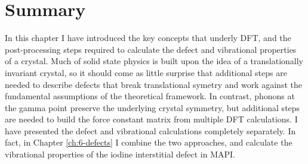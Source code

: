 
\section{Summary}

In this chapter I have introduced the key concepts that underly DFT, and the post-processing steps required to calculate the defect and vibrational properties of a crystal. 
Much of solid state physics is built upon the idea of a translationally invariant crystal, so it should come as little surprise that additional steps are needed to describe defects that break translational symetry and work against the fundamental assumptions of the theoretical framework.
In contrast, phonons at the gamma point preserve the underlying crystal symmetry, but additional steps are needed to build the force constant matrix from multiple DFT calculations.
I have presented the defect and vibrational calculations completely separately. In fact, in Chapter \ref{ch:6-defects} I combine the two approaches, and calculate the vibrational properties of the iodine interstitial defect in MAPI. 


